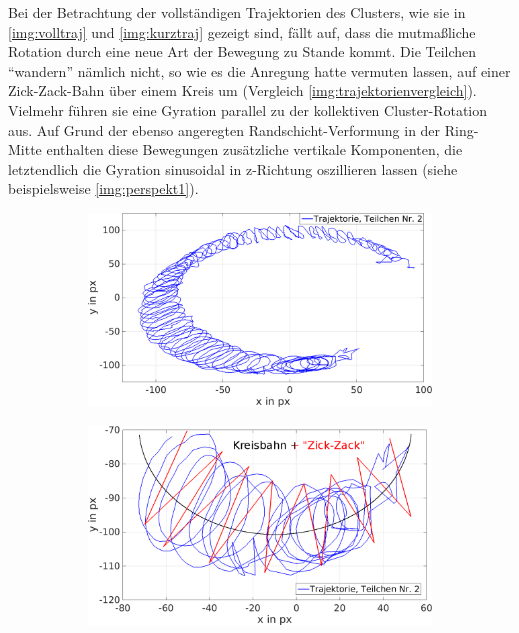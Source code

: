 \documentclass[numbers=noenddot,a4paper,notitlepage,twoside,BCOR15mm]{scrbook}
\begin{document}
					Bei der Betrachtung der vollständigen Trajektorien des Clusters, wie sie in \autoref{img:volltraj} und \autoref{img:kurztraj} gezeigt sind, fällt auf, dass die mutmaßliche Rotation durch eine neue Art der Bewegung zu Stande kommt. Die Teilchen "`wandern"' nämlich nicht, so wie es die Anregung hatte vermuten lassen, auf einer Zick-Zack-Bahn über einem Kreis um (Vergleich \autoref{img:trajektorienvergleich}). Vielmehr führen sie eine Gyration parallel zu der kollektiven Cluster-Rotation aus. Auf Grund der ebenso angeregten Randschicht-Verformung in der Ring-Mitte enthalten diese Bewegungen zusätzliche vertikale Komponenten, die letztendlich die Gyration sinusoidal in z-Richtung oszillieren lassen (siehe beispielsweise \autoref{img:perspekt1}).

						\begin{figure}[!h]
							\centering
							\begin{subfigure}{0.49\textwidth}
								\includegraphics[width=\textwidth,height=0.8\textwidth]{figs/auswertung/gyratauszuglang.png}
								\caption{}\label{img:kreisbahn}
							\end{subfigure}
							\begin{subfigure}{0.49\textwidth}
								\includegraphics[width=\textwidth,height=0.8\textwidth]{figs/auswertung/gyratkurzerauszug.png}

\end{subfigure}
\end{figure}
\end{document}
